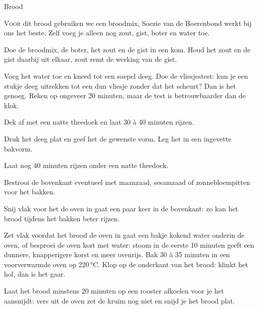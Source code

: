 \begin{recipe}{Brood}
\label{recipe:brood}


\lettrine{V}{oor} dit brood gebruiken we een broodmix, Soezie van de Boerenbond
werkt bij ons het beste. Zelf voeg je alleen nog zout, gist, boter en water
toe.

\begin{ingredients}
\end{ingredients}

\begin{steps}
  \item Doe de broodmix, de boter, het zout en de gist in een kom. Houd het
        zout en de gist daarbij uit elkaar, zout remt de werking van de gist.
  \item Voeg het water toe en kneed tot een soepel deeg. Doe de vliesjestest:
        kun je een stukje deeg uitrekken tot een dun vliesje zonder dat het
        scheurt? Dan is het genoeg. Reken op ongeveer 20 minuten, maar de
        test is betrouwbaarder dan de klok.
  \item Dek af met een natte theedoek en laat 30 à 40 minuten rijzen.
  \item Druk het deeg plat en geef het de gewenste vorm. Leg het in een
        ingevette bakvorm.
  \item Laat nog 40 minuten rijzen onder een natte theedoek.
  \item Bestrooi de bovenkant eventueel met maanzaad, sesamzaad of
        zonnebloempitten voor het bakken.
  \item Snij vlak voor het de oven in gaat een paar keer in de bovenkant:
        zo kan het brood tijdens het bakken beter rijzen.
  \item Zet vlak voordat het brood de oven in gaat een bakje kokend water
        onderin de oven, of besproei de oven kort met water: stoom in de
        eerste 10 minuten geeft een dunnere, knapperigere korst en meer
        ovenrijs. Bak 30 à 35 minuten in een voorverwarmde oven op 220\,°C.
        Klop op de onderkant van het brood: klinkt het hol, dan is het gaar.
  \item Laat het brood minstens 20 minuten op een rooster afkoelen voor je
        het aansnijdt: vers uit de oven zet de kruim nog niet en snijd je
        het brood plat.
\end{steps}

\end{recipe}

